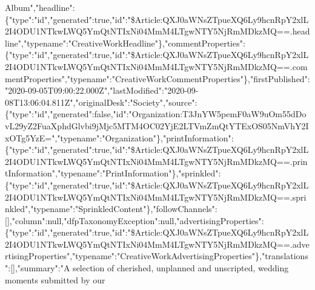 Album","headline":\{"type":"id","generated":true,"id":"\$Article:QXJ0aWNsZTpueXQ6Ly9hcnRpY2xlL2I4ODU1NTkwLWQ5YmQtNTIxNi04MmM4LTgwNTY5NjRmMDkzMQ==.headline","typename":"CreativeWorkHeadline"\},"commentProperties":\{"type":"id","generated":true,"id":"\$Article:QXJ0aWNsZTpueXQ6Ly9hcnRpY2xlL2I4ODU1NTkwLWQ5YmQtNTIxNi04MmM4LTgwNTY5NjRmMDkzMQ==.commentProperties","typename":"CreativeWorkCommentProperties"\},"firstPublished":"2020-09-05T09:00:22.000Z","lastModified":"2020-09-08T13:06:04.811Z","originalDesk":"Society","source":\{"type":"id","generated":false,"id":"Organization:T3JnYW5pemF0aW9uOm55dDovL29yZ2FuaXphdGlvbi9jMjc5MTM4OC02YjE2LTVmZmQtYTExOS05NmVhY2IxOTg5YzE=","typename":"Organization"\},"printInformation":\{"type":"id","generated":true,"id":"\$Article:QXJ0aWNsZTpueXQ6Ly9hcnRpY2xlL2I4ODU1NTkwLWQ5YmQtNTIxNi04MmM4LTgwNTY5NjRmMDkzMQ==.printInformation","typename":"PrintInformation"\},"sprinkled":\{"type":"id","generated":true,"id":"\$Article:QXJ0aWNsZTpueXQ6Ly9hcnRpY2xlL2I4ODU1NTkwLWQ5YmQtNTIxNi04MmM4LTgwNTY5NjRmMDkzMQ==.sprinkled","typename":"SprinkledContent"\},"followChannels":{[}{]},"column":null,"dfpTaxonomyException":null,"advertisingProperties":\{"type":"id","generated":true,"id":"\$Article:QXJ0aWNsZTpueXQ6Ly9hcnRpY2xlL2I4ODU1NTkwLWQ5YmQtNTIxNi04MmM4LTgwNTY5NjRmMDkzMQ==.advertisingProperties","typename":"CreativeWorkAdvertisingProperties"\},"translations":{[}{]},"summary":"A
selection of cherished, unplanned and unscripted, wedding moments
submitted by our
